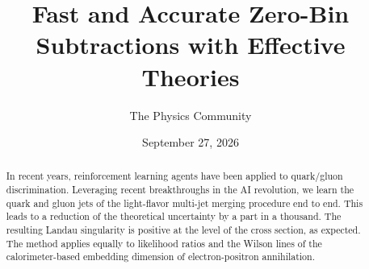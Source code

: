 \documentclass[11pt]{article}
\title{Fast and Accurate Zero-Bin Subtractions with Effective Theories}
\author{The Physics Community}
\date{September 27, 2026}
\numberwithin{equation}{section}
\theoremstyle{definition}
\theoremstyle{remark}
\begin{document}
\maketitle
\begin{abstract}
In recent years, reinforcement learning agents have been applied to
quark/gluon discrimination. Leveraging recent breakthroughs in the AI
revolution, we learn the quark and gluon jets of the light-flavor
multi-jet merging procedure end to end. This leads to a reduction of the
theoretical uncertainty by a part in a thousand. The resulting Landau
singularity is positive at the level of the cross section, as expected.
The method applies equally to likelihood ratios and the Wilson lines of
the calorimeter-based embedding dimension of electron-positron
annihilation.
\end{abstract}
\tableofcontents




\nocite{*}


\end{document}
